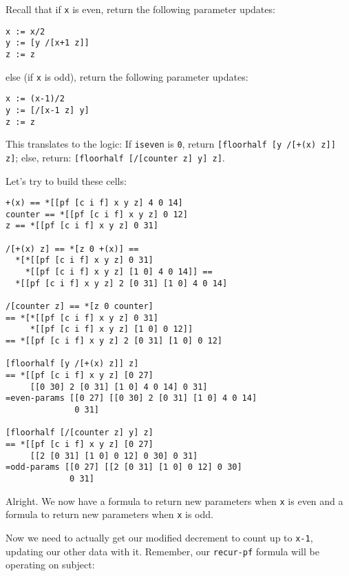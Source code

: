 \documentclass[twoside]{article}
\begin{document}
Recall that if \lstinline[style=inlinecode]{x} is even, return the following parameter updates:

\begin{lstlisting}[style=listingblock]
x := x/2
y := [y /[x+1 z]]
z := z
\end{lstlisting}

\noindent
else (if \lstinline[style=inlinecode]{x} is odd), return the following parameter updates:

\begin{lstlisting}[style=listingblock]
x := (x-1)/2
y := [/[x-1 z] y]
z := z
\end{lstlisting}

This translates to the logic:  If \lstinline[style=inlinecode]{iseven} is \lstinline[style=inlinecode]{0}, return \lstinline[style=inlinecode]{[floorhalf [y /[+(x) z]] z]}; else, return: \lstinline[style=inlinecode]{[floorhalf [/[counter z] y] z]}.

Let's try to build these cells:

\begin{lstlisting}[style=listingblock]
+(x) == *[[pf [c i f] x y z] 4 0 14]
counter == *[[pf [c i f] x y z] 0 12]
z == *[[pf [c i f] x y z] 0 31]

/[+(x) z] == *[z 0 +(x)] ==
  *[*[[pf [c i f] x y z] 0 31]
    *[[pf [c i f] x y z] [1 0] 4 0 14]] ==
  *[[pf [c i f] x y z] 2 [0 31] [1 0] 4 0 14]

/[counter z] == *[z 0 counter]
== *[*[[pf [c i f] x y z] 0 31]
     *[[pf [c i f] x y z] [1 0] 0 12]]
== *[[pf [c i f] x y z] 2 [0 31] [1 0] 0 12]

[floorhalf [y /[+(x) z]] z]
== *[[pf [c i f] x y z] [0 27]
     [[0 30] 2 [0 31] [1 0] 4 0 14] 0 31]
=even-params [[0 27] [[0 30] 2 [0 31] [1 0] 4 0 14]
              0 31]

[floorhalf [/[counter z] y] z]
== *[[pf [c i f] x y z] [0 27]
     [[2 [0 31] [1 0] 0 12] 0 30] 0 31]
=odd-params [[0 27] [[2 [0 31] [1 0] 0 12] 0 30]
             0 31]
\end{lstlisting}

Alright. We now have a formula to return new parameters when \lstinline[style=inlinecode]{x} is even and a formula to return new parameters when \lstinline[style=inlinecode]{x} is odd.

Now we need to actually get our modified decrement to count up to \lstinline[style=inlinecode]{x-1}, updating our other data with it. Remember, our \lstinline[style=inlinecode]{recur-pf} formula will be operating on subject:  
\end{document}
